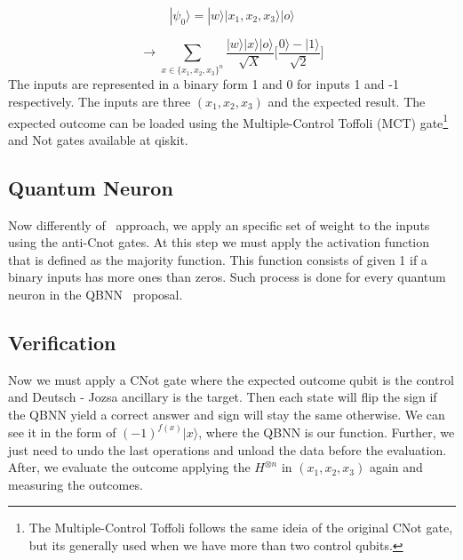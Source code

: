 \documentclass[conference]{IEEEtran}
\begin{document}
  \begin{equation}
          |\psi_0\rangle = |w\rangle|x_1, x_2, x_3\rangle|o\rangle
  \end{equation}

  \begin{equation}
          \rightarrow \sum_{x \in \{x_1, x_2, x_3\}^n}
          \frac{|w\rangle|x\rangle|o\rangle}{\sqrt{X}}\Bigg[\frac{0\rangle - |1\rangle}{\sqrt{2}}\Bigg]
  \end{equation}
  The inputs are represented in a binary form 1 and 0 for inputs 1 and -1 respectively.
  The inputs are three  $(x_1, x_2, x_3)$ and the expected result.
  The expected outcome can be loaded using the Multiple-Control Toffoli (MCT) gate\footnote{The Multiple-Control Toffoli
  follows the same ideia of the original CNot gate, but its generally used when we have more than two control qubits.} and Not gates available at qiskit.

\subsection{Quantum Neuron}\label{subsec:quantum-neuron}
  Now differently of~\cite{fawaz2019training} approach, we apply an specific set of weight to the inputs using the
  anti-Cnot gates.
  At this step we must apply the activation function that is defined as the majority function.
 This function consists of given 1 if a binary inputs has more ones than zeros.
  Such process is done for every quantum neuron in the QBNN~\cite{fawaz2019training} proposal.

\subsection{Verification}\label{subsec:verification}
  Now we must apply a CNot gate where the expected outcome qubit is the control and Deutsch - Jozsa ancillary is the target.
 Then each state will flip the sign if the QBNN yield a correct answer and sign will stay the same otherwise.
 We can see it in the form of \((-1)^{f(x)}|x\rangle\), where the QBNN is our function.
 Further, we just need to undo the last operations and unload the data before the evaluation.
 After, we evaluate the outcome applying the $H^{\otimes n}$ in $(x_1, x_2, x_3)$ again and measuring the outcomes.
\end{document}
